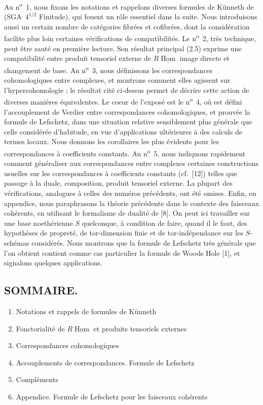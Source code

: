 \documentclass[11pt]{article}
\DeclareMathOperator{\Hom}{Hom}
\providecommand{\Hom}{\operatorname{Hom}}
\providecommand{\Hom}{\operatorname{Hom}}
\begin{document}
Au n\textsuperscript{o}~1, nous fixons les notations et rappelons diverses formules de Künneth de (SGA~$4^{1/2}$ Finitude), qui fouent un rôle essentiel dans la suite. Nous introduisons aussi un certain nombre de catégories fibrées et cofibrées, dont la considération facilite plus loin certaines vérifications de compatibilités. Le n\textsuperscript{o}~2, très technique, peut être sauté en première lecture. Son résultat principal (2.5) exprime une compatibilité entre produit tensoriel externe de $R\underline{\Hom}$ image directe et changement de base. Au n\textsuperscript{o}~3, nous définissons les correspondances cohomologiques entre complexes, et montrons comment elles agissent sur l'hypercohomologie ; le résultat cité ci-dessus permet de décrire cette action de diverses manières équivalentes. Le coeur de l'exposé est le n\textsuperscript{o}~4, où est défini l'accouplement de Verdier entre correspondances cohomologiques, et prouvée la formule de Lefschetz, dans une situation relative sensiblement plus générale que celle considérée d'habitude, en vue d'applications ultérieures à des calculs de termes locaux. Nous donnons les corollaires les plus évidents pour les correspondances à coefficients constants. Au n\textsuperscript{o}~5, nous indiquons rapidement comment généraliser aux correspondances entre complexes certaines constructions usuelles sur les correspondances à coefficients constants (cf.~[12]) telles que passage à la duale, composition, produit tensoriel externe. La plupart des vérifications, analogues à celles des numéros précédents, ont été omises. Enfin, en appendice, nous paraphrasons la théorie précédente dans le contexte des faisceaux cohérents, en utilisant le formalisme de dualité de [8]. On peut ici travailler sur une base noethérienne $S$ quelconque, à condition de faire, quand il le faut, des hypothèses de propreté, de tor-dimension finie et de tor-indépendance sur les $S$-schémas considérés. Nous montrons que la formule de Lefschetz très générale que l'on obtient contient comme cas particulier la formule de Woods Hole [1], et signalons quelques applications.

\subsection*{SOMMAIRE.}
\begin{enumerate}[label=\arabic*.]
\item
Notations et rappels de formules de Künneth
\item Fonctorialité de $R\underline{\Hom}$ et produits tensoriels externes
\item Correspondances cohomologiques
\item Accouplements de correspondances. Formule de Lefschetz
\item Compléments
\item Appendice. Formule de Lefschetz pour les faisceaux cohérents
\end{enumerate}
\end{document}
